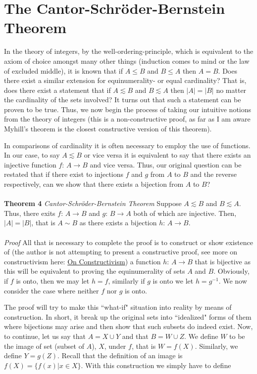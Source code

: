 \documentclass{article}
\begin{document}
\section{The Cantor-Schr\"oder-Bernstein Theorem}
\par In the theory of integers, by the well-ordering-principle, which is equivalent to the axiom of choice amongst many other things (induction comes to mind or the law of excluded middle), it is known that if $A \leq B$ and $B \leq A$ then $A=B$. Does there exist a similar extension for equinumerality- or equal cardinality? That is, does there exist a statement that if $A \lesssim B$ and $B \lesssim A$ then $|A|=|B|$ no matter the cardinality of the sets involved? It turns out that such a statement can be proven to be true. Thus, we now begin the process of taking our intuitive notions from the theory of integers (this is a non-constructive proof, as far as I am aware Myhill's theorem is the closest constructive version of this theorem).
\par In comparisons of cardinality it is often necessary to employ the use of functions. In our case, to say $A \lesssim B$ or vice versa it is equivalent to say that there exists an injective function $f$: $A \to B$ and vice versa. Thus, our original question can be restated that if there exist to injections $f$ and $g$ from $A$ to $B$ and the reverse respectively, can we show that there exists a bijection from $A$ to $B$? 
\\
\\
\textbf{Theorem 4} \textit{Cantor-Schr\"oder-Bernstein Theorem} Suppose $A \lesssim B$ and $B \lesssim A$. Thus, there exits $f$: $A \to B$ and $g$: $B \to A$ both of which are injective. Then, $|A|=|B|$, that is $A \sim B$ as there exists a bijection $h$: $A \to B$.  
\\
\\
\textit{Proof} All that is necessary to complete the proof is to construct or show existence of (the author is not attempting to present a constructive proof, see more on constructivism here: \href{https://polymathykhan.github.io/On_Constructivism.pdf}{On Constructivism}) a function $h$: $A \to B$ that is bijective as this will be equivalent to proving the equinumerality of sets $A$ and $B$. Obviously, if $f$ is onto, then we may let $h=f$, similarly if $g$ is onto we let $h=g^{-1}$. We now consider the case where neither $f$ nor $g$ is onto. 
\par The proof will try to make this ``what-if" situation into reality by means of construction. In short, it break up the original sets into ``idealized" forms of them where bijections may arise and then show that such subsets do indeed exist. Now, to continue, let us say that $A = X \cup Y$ and that $B = W \cup Z$. We define $W$ to be the image of set (subset of $A$), $X$, under $f$, that is $W=f(X)$. Similarly, we define $Y=g(Z)$. Recall that the definition of an image is $f(X)=\{f(x)|x \in X\}$. With this construction we simply have to define
\end{document}

